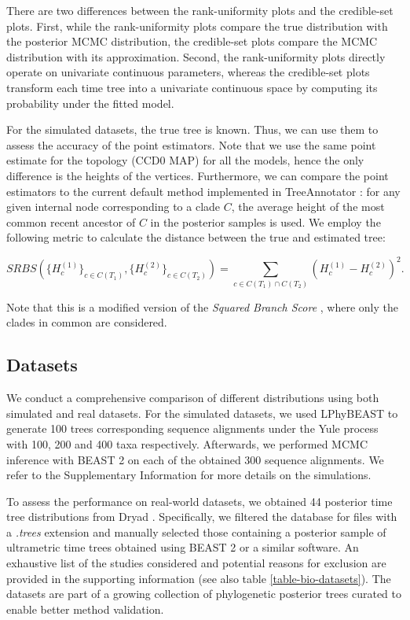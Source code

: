 \documentclass[10pt,letterpaper]{article}
\begin{document}
There are two differences between the rank-uniformity plots and the credible-set plots. First, while the rank-uniformity plots compare the true distribution with the posterior MCMC distribution, the credible-set plots compare the MCMC distribution with its approximation. Second, the rank-uniformity plots directly operate on univariate continuous parameters, whereas the credible-set plots transform each time tree into a univariate continuous space by computing its probability under the fitted model.

For the simulated datasets, the true tree is known. Thus, we can use them to assess the accuracy of the point estimators. Note that we use the same point estimate for the topology (CCD0 MAP) for all the models, hence the only difference is the heights of the vertices. Furthermore, we can compare the point estimators to the current default method implemented in TreeAnnotator \cite{treeannotator}: for any given internal node corresponding to a clade $C$, the average height of the most common recent ancestor of $C$ in the posterior samples is used. We employ the following metric to calculate the distance between the true and estimated tree:

$$
SRBS\left(\{H^{(1)}_c\}_{c \in C(T_1)}, \{H^{(2)}_c\}_{c \in C(T_2)}\right) = \sum_{c \in C(T_1) \cap C(T_2)} \left(H^{(1)}_c-H^{(2)}_c\right)^2 .
$$

Note that this is a modified version of the \emph{Squared Branch Score} \cite{treesinforest}, where only the clades in common are considered.



\subsection*{Datasets}

We conduct a comprehensive comparison of different distributions using both simulated and real datasets. For the simulated datasets, we used LPhyBEAST \cite{linguaphylo} to generate 100 trees corresponding sequence alignments under the Yule process with 100, 200 and 400 taxa respectively. Afterwards, we performed MCMC inference with BEAST 2 \cite{beast2} on each of the obtained 300 sequence alignments. We refer to the Supplementary Information for more details on the simulations.

To assess the performance on real-world datasets, we obtained 44 posterior time tree distributions from Dryad \cite{dryad}. Specifically, we filtered the database for files with a \emph{.trees} extension and manually selected those containing a posterior sample of ultrametric time trees obtained using BEAST 2 or a similar software. An exhaustive list of the studies considered and potential reasons for exclusion are provided in the supporting information (see also table \ref{table-bio-datasets}). The datasets are part of a growing collection of phylogenetic posterior trees \cite{tree_dataset} curated to enable better method validation.
\end{document}

